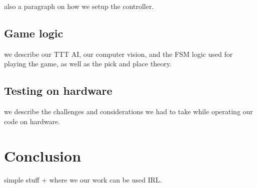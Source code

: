 \documentclass{article}
\begin{document}
also a paragraph on how we setup the controller.

\subsection{Game logic}

we describe our TTT AI, our computer vision, and the FSM logic used for playing the game, as well as the pick and place theory.

\subsection{Testing on hardware}

we describe the challenges and considerations we had to take while operating our code on hardware.

\section{Conclusion}

simple stuff + where we our work can be used IRL.

\printbibliography[heading=bibintoc]
\end{document}

